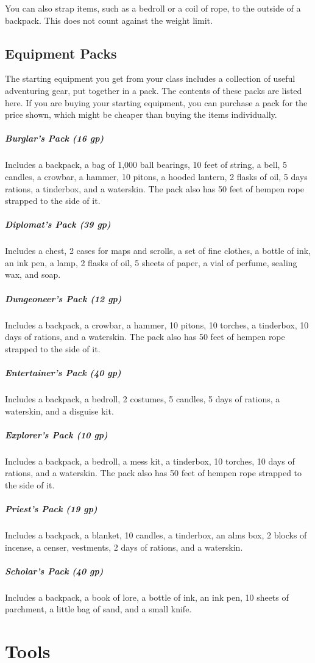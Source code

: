 You can also strap items, such as a bedroll or a coil of rope, to the outside of a backpack. This does not count against the weight limit.

\subsection{Equipment Packs}

The starting equipment you get from your class includes a collection of useful adventuring gear, put together in a pack. The contents of these packs are listed here. If you are buying your starting equipment, you can purchase a pack for the price shown, which might be cheaper than buying the items individually.

\subparagraph*{Burglar's Pack (16 gp)} Includes a backpack, a bag of 1,000 ball bearings, 10 feet of string, a bell, 5 candles, a crowbar, a hammer, 10 pitons, a hooded lantern, 2 flasks of oil, 5 days rations, a tinderbox, and a waterskin. The pack also has 50 feet of hempen rope strapped to the side of it.

\subparagraph*{Diplomat's Pack (39 gp)} Includes a chest, 2 cases for maps and scrolls, a set of fine clothes, a bottle of ink, an ink pen, a lamp, 2 flasks of oil, 5 sheets of paper, a vial of perfume, sealing wax, and soap.

\subparagraph*{Dungeoneer's Pack (12 gp)} Includes a backpack, a crowbar, a hammer, 10 pitons, 10 torches, a tinderbox, 10 days of rations, and a waterskin. The pack also has 50 feet of hempen rope strapped to the side of it.

\subparagraph*{Entertainer's Pack (40 gp)} Includes a backpack, a bedroll, 2 costumes, 5 candles, 5 days of rations, a waterskin, and a disguise kit.

\subparagraph*{Explorer's Pack (10 gp)} Includes a backpack, a bedroll, a mess kit, a tinderbox, 10 torches, 10 days of rations, and a waterskin. The pack also has 50 feet of hempen rope strapped to the side of it.

\subparagraph*{Priest's Pack (19 gp)} Includes a backpack, a blanket, 10 candles, a tinderbox, an alms box, 2 blocks of incense, a censer, vestments, 2 days of rations, and a waterskin.

\subparagraph*{Scholar's Pack (40 gp)} Includes a backpack, a book of lore, a bottle of ink, an ink pen, 10 sheets of parchment, a little bag of sand, and a small knife.

\section{Tools}

